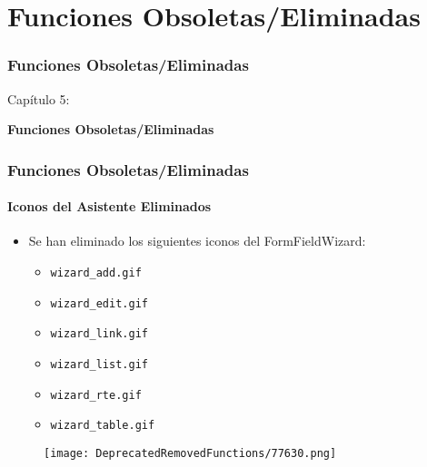 %

\section{Funciones Obsoletas/Eliminadas}
\begin{frame}[fragile]
	\frametitle{Funciones Obsoletas/Eliminadas}

	\begin{center}\huge{Capítulo 5:}\end{center}
	\begin{center}\huge{\color{typo3darkgrey}\textbf{Funciones Obsoletas/Eliminadas}}\end{center}

\end{frame}

\begin{frame}[fragile]
	\frametitle{Funciones Obsoletas/Eliminadas}
	\framesubtitle{Iconos del Asistente Eliminados}

	\begin{itemize}

		\item Se han eliminado los siguientes iconos del FormFieldWizard:

			\begin{itemize}
				\item \texttt{wizard\_add.gif}
				\item \texttt{wizard\_edit.gif}
				\item \texttt{wizard\_link.gif}
				\item \texttt{wizard\_list.gif}
				\item \texttt{wizard\_rte.gif}
				\item \texttt{wizard\_table.gif}
			\end{itemize}

	\end{itemize}

	\begin{figure}
		\texttt{[image: DeprecatedRemovedFunctions/77630.png]}
	\end{figure}

\end{frame}

